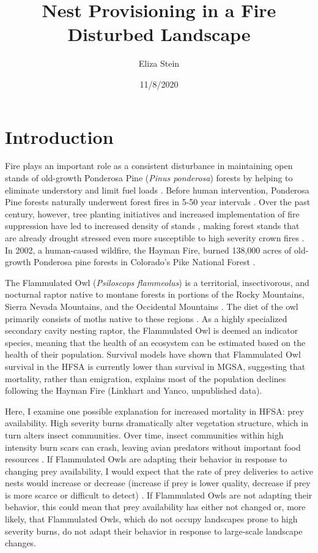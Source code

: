 \documentclass[
]{article}
\title{Nest Provisioning in a Fire Disturbed Landscape}
\author{Eliza Stein}
\date{11/8/2020}
\begin{document}
\maketitle

\hypertarget{introduction}{%
\section{Introduction}\label{introduction}}

Fire plays an important role as a consistent disturbance in maintaining
open stands of old-growth Ponderosa Pine (\emph{Pinus ponderosa})
forests by helping to eliminate understory and limit fuel loads
\citep{veblen2000climatic}. Before human intervention, Ponderosa Pine
forests naturally underwent forest fires in 5-50 year intervals
\citep{veblen2000climatic}. Over the past century, however, tree
planting initiatives and increased implementation of fire suppression
have led to increased density of stands \citep{griffis2001understory},
making forest stands that are already drought stressed even more
susceptible to high severity crown fires \citep{veblen2000climatic}. In
2002, a human-caused wildfire, the Hayman Fire, burned 138,000 acres of
old-growth Ponderosa pine forests in Colorado's Pike National Forest
\citep{graham2003hayman}.

The Flammulated Owl (\emph{Psiloscops flammeolus}) is a territorial,
insectivorous, and nocturnal raptor native to montane forests in
portions of the Rocky Mountains, Sierra Nevada Mountains, and the
Occidental Mountains \citep{linkhart2013flammulated}. The diet of the
owl primarily consists of moths native to these regions
\citep{linkhart2013flammulated}. As a highly specialized secondary
cavity nesting raptor, the Flammulated Owl is deemed an indicator
species, meaning that the health of an ecosystem can be estimated based
on the health of their population. Survival models have shown that
Flammulated Owl survival in the HFSA is currently lower than survival in
MGSA, suggesting that mortality, rather than emigration, explains most
of the population declines following the Hayman Fire (Linkhart and
Yanco, unpublished data).

Here, I examine one possible explanation for increased mortality in
HFSA: prey availability. High severity burns dramatically alter
vegetation structure, which in turn alters insect communities. Over
time, insect communities within high intensity burn scars can crash,
leaving avian predators without important food resources
\citep{nappi2010effect}. If Flammulated Owls are adapting their behavior
in response to changing prey availability, I would expect that the rate
of prey deliveries to active nests would increase or decrease (increase
if prey is lower quality, decrease if prey is more scarce or difficult
to detect) \citep{zarybnicka2009tengmalm}. If Flammulated Owls are not
adapting their behavior, this could mean that prey availability has
either not changed or, more likely, that Flammulated Owls, which do not
occupy landscapes prone to high severity burns, do not adapt their
behavior in response to large-scale landscape changes.
\end{document}
